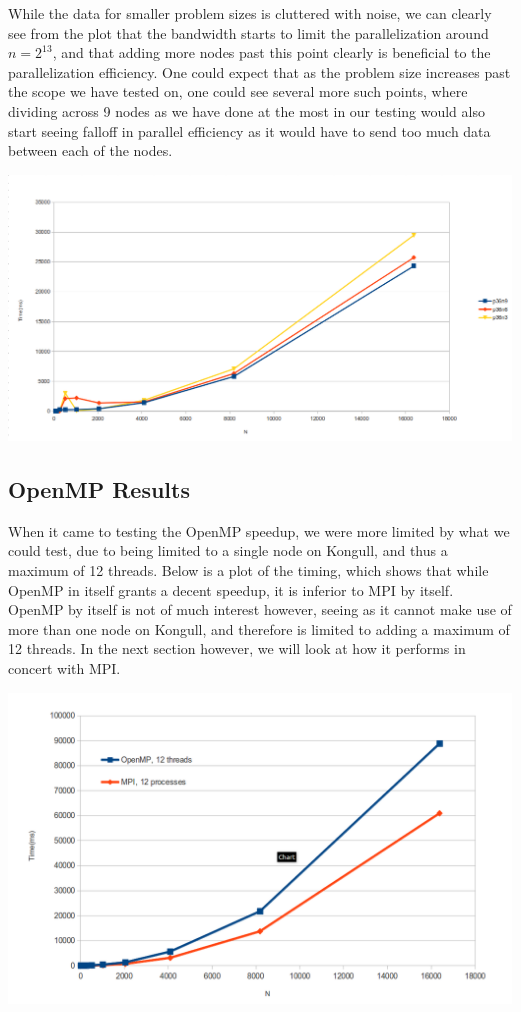 \documentclass[fontsize=11pt,paper=a4,titlepage]{article}
\begin{document}
While the data for smaller problem sizes is cluttered with noise, we can clearly
see from the plot that the bandwidth starts to limit the parallelization around
$n = 2^{13}$, and that adding more nodes past this point clearly is beneficial
to the parallelization efficiency. One could expect that as the problem size
increases past the scope we have tested on, one could see several more such
points, where dividing across 9 nodes as we have done at the most in our testing
would also start seeing falloff in parallel efficiency as it would have to send
too much data between each of the nodes.

\hspace*{-1.5cm}\includegraphics[scale=0.6]{pics/p36nX.png}

\subsection{OpenMP Results}

When it came to testing the OpenMP speedup, we were more limited by what we
could test, due to being limited to a single node on Kongull, and thus a maximum
of 12 threads. Below is a plot of the timing, which shows that while OpenMP in
itself grants a decent speedup, it is inferior to MPI by itself. OpenMP by
itself is not of much interest however, seeing as it cannot make use of more
than one node on Kongull, and therefore is limited to adding a maximum of 12
threads. In the next section however, we will look at how it performs in concert
with MPI.

\hspace*{-1.7cm}\includegraphics[scale=0.6]{pics/omp.png}
\end{document}
